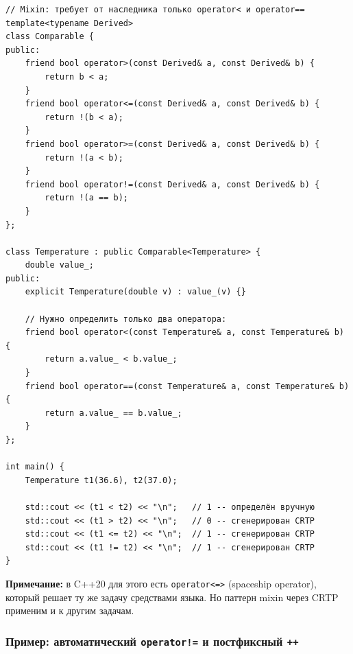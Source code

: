 \documentclass[a4paper,12pt]{article}
\begin{document}
\begin{lstlisting}
// Mixin: требует от наследника только operator< и operator==
template<typename Derived>
class Comparable {
public:
    friend bool operator>(const Derived& a, const Derived& b) {
        return b < a;
    }
    friend bool operator<=(const Derived& a, const Derived& b) {
        return !(b < a);
    }
    friend bool operator>=(const Derived& a, const Derived& b) {
        return !(a < b);
    }
    friend bool operator!=(const Derived& a, const Derived& b) {
        return !(a == b);
    }
};

class Temperature : public Comparable<Temperature> {
    double value_;
public:
    explicit Temperature(double v) : value_(v) {}

    // Нужно определить только два оператора:
    friend bool operator<(const Temperature& a, const Temperature& b) {
        return a.value_ < b.value_;
    }
    friend bool operator==(const Temperature& a, const Temperature& b) {
        return a.value_ == b.value_;
    }
};

int main() {
    Temperature t1(36.6), t2(37.0);

    std::cout << (t1 < t2) << "\n";   // 1 -- определён вручную
    std::cout << (t1 > t2) << "\n";   // 0 -- сгенерирован CRTP
    std::cout << (t1 <= t2) << "\n";  // 1 -- сгенерирован CRTP
    std::cout << (t1 != t2) << "\n";  // 1 -- сгенерирован CRTP
}
\end{lstlisting}

\textbf{Примечание:} в C++20 для этого есть \texttt{operator<=>} (spaceship operator),
который решает ту же задачу средствами языка. Но паттерн mixin через CRTP применим
и к другим задачам.

\subsubsection{Пример: автоматический \texttt{operator!=} и постфиксный \texttt{++}}
\end{document}
